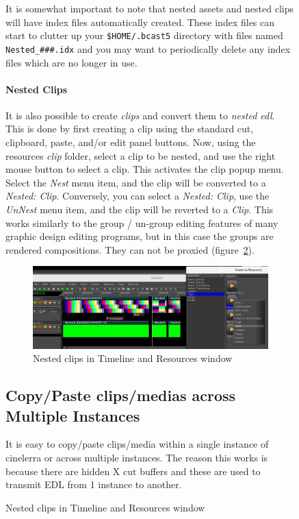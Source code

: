 \begin{figure}
It is somewhat important to note that nested assets and nested clips will have index files automatically created.  These index files can start to clutter up your \texttt{\$HOME/.bcast5} directory with files named \texttt{Nested\_\#\#\#.idx} and you may want to periodically delete any index files which are no longer in use.

\paragraph{Nested Clips} It is also possible to create \textit{clips} and convert them to \textit{nested edl}.  This is done by first creating a clip using the standard cut, clipboard, paste, and/or edit panel buttons.  Now, using the resources \textit{clip} folder, select a clip to be nested, and use the right mouse button to select a clip.  This activates the clip popup menu.  Select the \textit{Nest} menu item, and the clip will be converted to a \textit{Nested: Clip}. Conversely, you can select a \textit{Nested: Clip}, use the \textit{UnNest} menu item, and the clip will be reverted to a \textit{Clip}.  This works similarly to the group / un-group editing features of many graphic design editing programs, but in this case the groups are rendered compositions.  They can not be proxied (figure~\ref{fig:nesting}).
\begin{figure}[htpb]
    \centering
    \includegraphics[width=0.9\linewidth]{images/nesting.png}
    \caption{Nested clips in Timeline and Resources window}
    \label{fig:nesting}
\end{figure}

\subsection{Copy/Paste clips/medias across Multiple Instances}%
\label{sub:copy_paste_multiple_instances}

It is easy to copy/paste clips/media within a single instance of cinelerra or across multiple instances.  The reason this works is because there are hidden X cut buffers and these are used to transmit EDL from 1 instance to another.


\end{figure}
